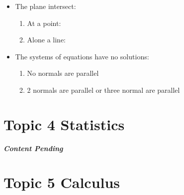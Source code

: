 \documentclass[12pt, a4paper]{article}
\begin{document}
\begin{enumerate}
\begin{itemize}
    \item The plane intersect: 
    \begin{enumerate}
      \item At a point: {\color{green}{the system of equations will have a unique solution.}}
      \item Alone a line: {\color{green}{the system of equations will have infinitely many solutions}}
    \end{enumerate}
    \item The systems of equations have no solutions: 
    \begin{enumerate}
      \item No normals are parallel {\color{green}{(the planes from a prism)}}
      \item 2 normals are parallel or three normal are parallel {\color{green}{(the planes are parallel)}}
    \end{enumerate}
  \end{itemize}
\end{enumerate}

\newpage
\section{Topic 4 Statistics}
\begin{center}
\textbf{\textit{Content Pending}}
\end{center}

\newpage
\section{Topic 5 Calculus}
\end{document}
